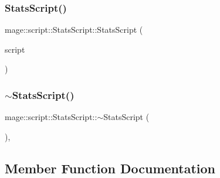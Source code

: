 \hypertarget{classmage_1_1script_1_1_stats_script_ade098c40acffbe1089664564411dd589}{}\label{classmage_1_1script_1_1_stats_script_ade098c40acffbe1089664564411dd589} 
\subsubsection{\texorpdfstring{Stats\+Script()}{StatsScript()}\hspace{0.1cm}{\footnotesize\ttfamily [3/3]}}
{\footnotesize\ttfamily mage\+::script\+::\+Stats\+Script\+::\+Stats\+Script (\begin{DoxyParamCaption}\item[{\hyperlink{classmage_1_1script_1_1_stats_script}{Stats\+Script} \&\&}]{script }\end{DoxyParamCaption})\hspace{0.3cm}{\ttfamily [default]}}

\hypertarget{classmage_1_1script_1_1_stats_script_a5b9b30aa6939968c2aee8cdf11f6486c}{}\label{classmage_1_1script_1_1_stats_script_a5b9b30aa6939968c2aee8cdf11f6486c} 
\subsubsection{\texorpdfstring{$\sim$\+Stats\+Script()}{~StatsScript()}}
{\footnotesize\ttfamily mage\+::script\+::\+Stats\+Script\+::$\sim$\+Stats\+Script (\begin{DoxyParamCaption}{ }\end{DoxyParamCaption})\hspace{0.3cm}{\ttfamily [virtual]}, {\ttfamily [default]}}



\subsection{Member Function Documentation}
\hypertarget{classmage_1_1script_1_1_stats_script_ad33bbb402575b5abcb2639817d27b180}{}\label{classmage_1_1script_1_1_stats_script_ad33bbb402575b5abcb2639817d27b180} 
